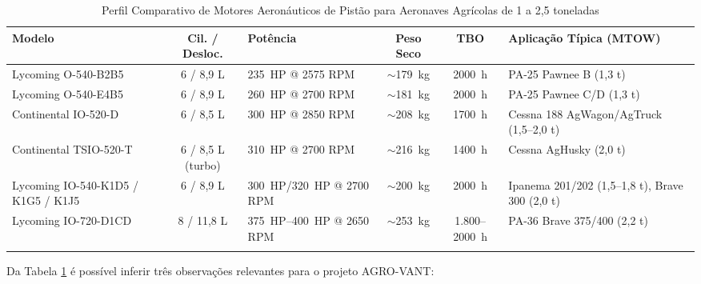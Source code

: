 \documentclass[a4paper,12pt]{article}
\begin{document}
\begin{table}[H]
\centering
\caption{Perfil Comparativo de Motores Aeronáuticos de Pistão para Aeronaves Agrícolas de 1 a 2{,}5 toneladas}
\label{tab:motores_faixa}
\footnotesize
\renewcommand{\arraystretch}{1.3}
\begin{tabularx}{\textwidth}{@{} 
    >{\hsize=1.0\hsize\raggedright\arraybackslash}X 
    c 
    >{\hsize=0.8\hsize\raggedright\arraybackslash}X 
    c 
    c 
    >{\hsize=1.2\hsize\raggedright\arraybackslash}X 
    @{}}
\toprule
\textbf{Modelo} & \textbf{Cil. / Desloc.} & \textbf{Potência} & \textbf{Peso Seco} & \textbf{TBO} & \textbf{Aplicação Típica (MTOW)} \\ \midrule
Lycoming O-540-B2B5 & 6 / 8{,}9 L & \SI{235}{HP} @ 2575 RPM & $\sim$\SI{179}{kg} & \SI{2000}{h} & PA-25 Pawnee B (1{,}3 t) \\
\addlinespace
Lycoming O-540-E4B5 & 6 / 8{,}9 L & \SI{260}{HP} @ 2700 RPM & $\sim$\SI{181}{kg} & \SI{2000}{h} & PA-25 Pawnee C/D (1{,}3 t) \\
\addlinespace
Continental IO-520-D & 6 / 8{,}5 L & \SI{300}{HP} @ 2850 RPM & $\sim$\SI{208}{kg} & \SI{1700}{h} & Cessna 188 AgWagon/AgTruck (1{,}5--2{,}0 t) \\
\addlinespace
Continental TSIO-520-T & 6 / 8{,}5 L (turbo) & \SI{310}{HP} @ 2700 RPM & $\sim$\SI{216}{kg} & \SI{1400}{h} & Cessna AgHusky (2{,}0 t) \\
\addlinespace
Lycoming IO-540-K1D5 / K1G5 / K1J5 & 6 / 8{,}9 L & \SI{300}{HP}/\SI{320}{HP} @ 2700 RPM & $\sim$\SI{200}{kg} & \SI{2000}{h} & Ipanema 201/202 (1{,}5--1{,}8 t), Brave 300 (2{,}0 t) \\
\addlinespace
Lycoming IO-720-D1CD & 8 / 11{,}8 L & \SI{375}{HP}--\SI{400}{HP} @ 2650 RPM & $\sim$\SI{253}{kg} & 1.800--\SI{2000}{h} & PA-36 Brave 375/400 (2{,}2 t) \\ \bottomrule
\multicolumn{6}{l}{\footnotesize Compilação do autor a partir de \cite{lycomingmanual, io360manual, lycoming_io720, continental_io520, embraer202, piper_pa25, cessna_188, piper_pa36}.}
\end{tabularx}
\end{table}

Da Tabela \ref{tab:motores_faixa} é possível inferir três observações relevantes para o projeto AGRO-VANT:
\end{document}
